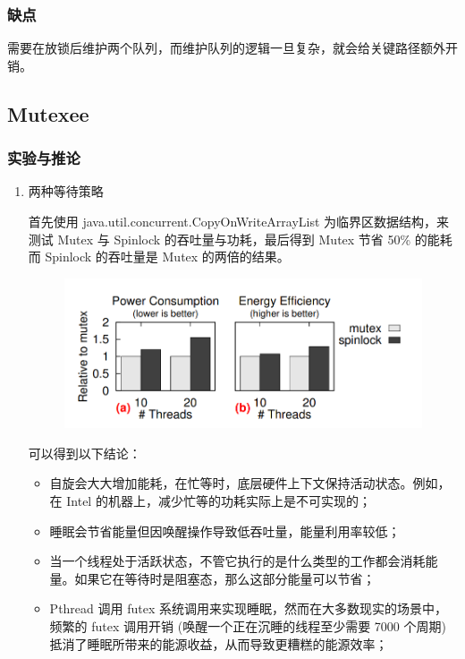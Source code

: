 \documentclass[UTF8]{ctexart}
\begin{document}
\subsubsection{缺点}

需要在放锁后维护两个队列，而维护队列的逻辑一旦复杂，就会给关键路径额外开销。

\subsection{Mutexee}

\subsubsection{实验与推论}

\begin{enumerate}
    \item 两种等待策略

    首先使用 java.util.concurrent.CopyOnWriteArrayList 为临界区数据结构，来测试 Mutex 与 Spinlock 的吞吐量与功耗，最后得到 Mutex 节省 50\% 的能耗而 Spinlock 的吞吐量是 Mutex 的两倍的结果。

    \begin{figure}[ht]
        \centering
        \includegraphics[scale=0.4]{images/img2.png}
    \end{figure}

    可以得到以下结论：

    \begin{itemize}
        \item 自旋会大大增加能耗，在忙等时，底层硬件上下文保持活动状态。例如，在 Intel 的机器上，减少忙等的功耗实际上是不可实现的；
        \item 睡眠会节省能量但因唤醒操作导致低吞吐量，能量利用率较低；
        \item 当一个线程处于活跃状态，不管它执行的是什么类型的工作都会消耗能量。如果它在等待时是阻塞态，那么这部分能量可以节省；
        \item Pthread 调用 futex 系统调用来实现睡眠，然而在大多数现实的场景中，频繁的 futex 调用开销 (唤醒一个正在沉睡的线程至少需要 7000 个周期) 抵消了睡眠所带来的能源收益，从而导致更糟糕的能源效率；
    \end{itemize}


\end{enumerate}
\end{document}
